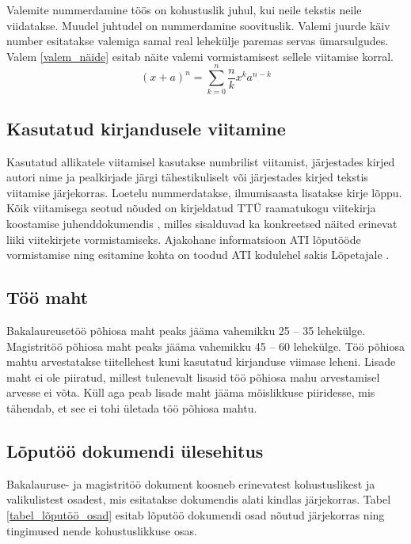 \documentclass[12pt]{article} %
\begin{document}
Valemite nummerdamine töös on kohustuslik juhul, kui neile tekstis neile viidatakse. Muudel juhtudel on nummerdamine soovituslik. Valemi juurde käiv number esitatakse valemiga samal real lehekülje paremas servas ümarsulgudes. Valem \ref{valem_näide} esitab näite valemi vormistamisest sellele viitamise korral.
\begin{equation}
\label{valem_näide}
(x + a )^n = \sum\limits_{k=0}^n \frac{n}{k} x^ka^{n-k}
\end{equation}


\subsection{Kasutatud kirjandusele viitamine}
\label{Kasutatud kirjandusele viitamine} %
Kasutatud allikatele viitamisel kasutakse numbrilist viitamist, järjestades kirjed autori nime ja pealkirjade järgi tähestikuliselt või järjestades kirjed tekstis viitamise järjekorras. Loetelu nummerdatakse, ilmumisaasta lisatakse kirje lõppu. Kõik viitamisega seotud nõuded on kirjeldatud TTÜ raamatukogu viitekirja koostamise juhenddokumendis , milles sisalduvad ka konkreetsed näited erinevat liiki viitekirjete vormistamiseks. Ajakohane informatsioon ATI lõputööde vormistamise ning esitamine kohta on toodud ATI kodulehel sakis Lõpetajale \cite{l6petajale13}.

\subsection{Töö maht}
\label{Töö maht} %
Bakalaureusetöö põhiosa maht peaks jääma vahemikku 25 – 35 lehekülge. Magistritöö põhiosa maht peaks jääma vahemikku 45 – 60 lehekülge. Töö põhiosa mahtu arvestatakse tiitellehest kuni kasutatud kirjanduse viimase leheni. Lisade maht ei ole piiratud, millest tulenevalt lisasid töö põhiosa mahu arvestamisel arvesse ei võta. Küll aga peab lisade maht jääma mõislikkuse piiridesse, mis tähendab, et see ei tohi ületada töö põhiosa mahtu.

\subsection{Lõputöö dokumendi ülesehitus}
\label{Lõputöö dokumendi ülesehitus} %

Bakalauruse- ja magistritöö dokument koosneb erinevatest kohustuslikest ja valikulistest osadest, mis esitatakse dokumendis alati kindlas järjekorras. Tabel \ref{tabel_lõputöö_osad} esitab lõputöö dokumendi osad nõutud järjekorras ning tingimused nende kohustuslikkuse osas.
\end{document}
